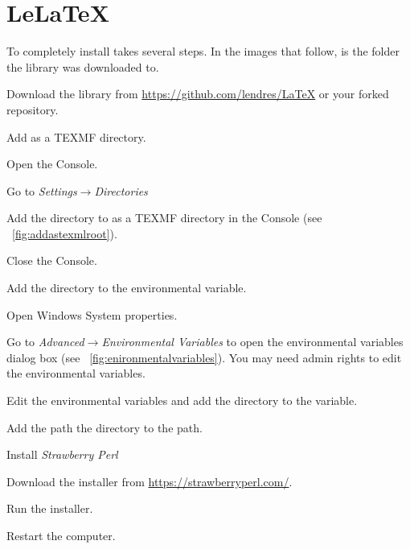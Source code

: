 \section{LeLaTeX}
To completely install \lelatex{} takes several steps.  In the images that follow,  is the folder the \lelatex{} library was downloaded to.

\begin{outline}
	\item Download the library from \href{https://github.com/lendres/LaTeX}{https://github.com/lendres/LaTeX} or your forked repository.
	\item Add \lelatex{} as a TEXMF directory.
	\begin{outline}
		\item Open the \miktex{} Console.
		\item Go to \emph{Settings$\rightarrow$Directories}
		\item Add the directory to as a TEXMF directory in the \miktex{} Console (see \figurename~\ref{fig:addastexmlroot}).
		\item Close the \miktex{} Console.
	\end{outline}
	\item Add the  directory to the  environmental variable.
	\begin{outline}
		\item Open Windows System properties.
		\item Go to \emph{Advanced$\rightarrow$Environmental Variables} to open the environmental variables dialog box (see \figurename~\ref{fig:enironmentalvariables}).  You may need admin rights to edit the environmental variables.
		\item Edit the environmental variables and add the  directory to the  variable.
		\item Add the path the  directory to the path.
	\end{outline}
	\item Install \emph{Strawberry Perl}
	\begin{outline}
		\item Download the installer from \href{https://strawberryperl.com/}{https://strawberryperl.com/}.
		\item Run the installer.
		\item Restart the computer.
	\end{outline}
\end{outline}


